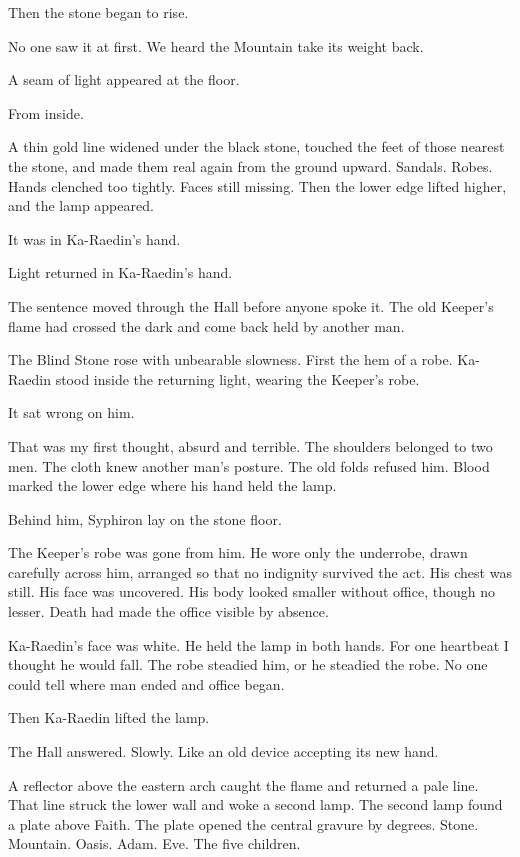 Then the stone began to rise.\par
No one saw it at first.
We heard the Mountain take its weight back.\par
A seam of light appeared at the floor.\par
From inside.\par
A thin gold line widened under the black stone, touched the feet of those nearest the stone, and made them real again from the ground upward.
Sandals.
Robes.
Hands clenched too tightly.
Faces still missing.
Then the lower edge lifted higher, and the lamp appeared.\par
It was in Ka-Raedin's hand.\par
Light returned in Ka-Raedin's hand.\par
The sentence moved through the Hall before anyone spoke it.
The old Keeper's flame had crossed the dark and come back held by another man.\par
The Blind Stone rose with unbearable slowness.
First the hem of a robe.
Ka-Raedin stood inside the returning light, wearing the Keeper's robe.\par
It sat wrong on him.\par
That was my first thought, absurd and terrible.
The shoulders belonged to two men.
The cloth knew another man's posture.
The old folds refused him.
Blood marked the lower edge where his hand held the lamp.\par
Behind him, Syphiron lay on the stone floor.\par
The Keeper's robe was gone from him.
He wore only the underrobe, drawn carefully across him, arranged so that no indignity survived the act.
His chest was still.
His face was uncovered.
His body looked smaller without office, though no lesser.
Death had made the office visible by absence.\par
Ka-Raedin's face was white.
He held the lamp in both hands.
For one heartbeat I thought he would fall.
The robe steadied him, or he steadied the robe.
No one could tell where man ended and office began.\par
Then Ka-Raedin lifted the lamp.\par
The Hall answered.
Slowly.
Like an old device accepting its new hand.\par
A reflector above the eastern arch caught the flame and returned a pale line.
That line struck the lower wall and woke a second lamp.
The second lamp found a plate above Faith.
The plate opened the central gravure by degrees.
Stone.
Mountain.
Oasis.
Adam.
Eve.
The five children.

